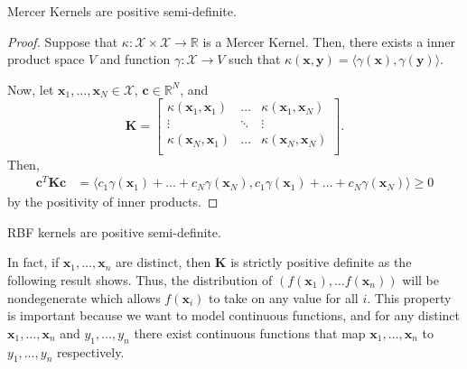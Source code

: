 \begin{lemma}
    Mercer Kernels are positive semi-definite.
\end{lemma}
\begin{proof}
    Suppose that $\kappa: \mathcal{X} \times \mathcal{X} \to \mathbb{R}$ is a Mercer Kernel.
    Then, there exists a inner product space $V$ and function $\gamma: \mathcal{X} \to V$ such that $\kappa(\mathbf{x}, \mathbf{y}) = \langle\gamma(\mathbf{x}), \gamma(\mathbf{y})\rangle$.

    Now, let $\mathbf{x}_1, \dots, \mathbf{x}_N \in \mathcal{X}$, $\mathbf{c} \in \mathbb{R}^{N}$, and
    \begin{equation*}
        \mathbf{K} =
        \begin{bmatrix}
            \kappa(\mathbf{x}_1, \mathbf{x}_1) & \dots & \kappa(\mathbf{x}_1, \mathbf{x}_N) \\
            \vdots & \ddots & \vdots \\
            \kappa(\mathbf{x}_N, \mathbf{x}_1) & \dots & \kappa(\mathbf{x}_N, \mathbf{x}_N) \\
        \end{bmatrix}
        .
    \end{equation*}
    Then,
    \begin{align*}
        \mathbf{c}^{T} \mathbf{K} \mathbf{c}
        & = \langle c_1 \gamma(\mathbf{x}_1) + \dots + c_N \gamma(\mathbf{x}_N), c_1 \gamma(\mathbf{x}_1) + \dots + c_N \gamma(\mathbf{x}_N) \rangle
        \geq 0
    \end{align*}
    by the positivity of inner products.
\end{proof}

\begin{corollary}
    \label{corr:rbf-psd}
    RBF kernels are positive semi-definite.
\end{corollary}

In fact, if $\mathbf{x}_1, \dots, \mathbf{x}_n$ are distinct, then $\mathbf{K}$ is strictly positive definite as the following result shows.
Thus, the distribution of $(f(\mathbf{x}_1), \dots f(\mathbf{x}_n))$ will be nondegenerate which allows $f(\mathbf{x}_i)$ to take on any value for all $i$.
This property is important because we want to model continuous functions, and for any distinct $\mathbf{x}_1, \dots, \mathbf{x}_n$ and $y_1, \dots, y_n$ there exist continuous functions that map $\mathbf{x}_1, \dots, \mathbf{x}_n$ to $y_1, \dots, y_n$ respectively.

